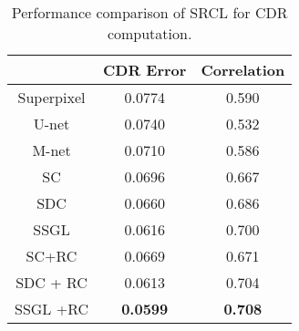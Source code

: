 \documentclass[journal]{IEEEtran}
\begin{document}
\begin{table}
  \caption{ Performance comparison of SRCL for   CDR computation.
} \begin{center}
        \begin{tabular}{c|c|c   } \hline
     & {CDR Error}  &    Correlation
               \\\hline
         	Superpixel \cite{tmi2013} & 0.0774 & 0.590 \\ \hline
         U-net \cite{Ronneberger2015}  & 0.0740  & 0.532  \\ \hline
         M-net \cite{huazhu18} & 0.0710  &  0.586 \\ \hline
             SC \cite{sparsecoding}   & 0.0696& 0.667       \\\hline

                       SDC \cite{CJ15}  & 0.0660  &    0.686         \\\hline
                     SSGL \cite{Cheng:17BOE} & 0.0616 & 0.700 \\\hline
                        SC+RC & 0.0669  & 0.671    \\ \hline
                           SDC + RC  &  0.0613    &    0.704        \\\hline
                SSGL +RC & \textbf{0.0599}  & \textbf{0.708}  \\\hline
        \end{tabular}
    \end{center}
 \label{table1}
\end{table}
\end{document}
